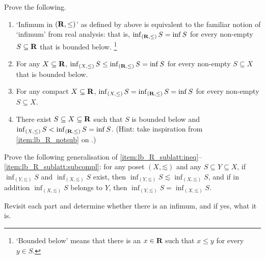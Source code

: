 \begin{exercise}
	\label{exercise:lb-R_sublatt}
	Prove the following.

	\begin{enumerate}[label=(\alph*)]

		\item `Infimum in $(\mathbf{R},\mathord{\leq})$' as defined by  above is equivalent to the familiar notion of `infimum' from real analysis: that is, $\inf_{(\mathbf{R},\mathord{\leq})} S = \inf S$ for every non-empty $S \subseteq \mathbf{R}$ that is bounded below.%
			\footnote{`Bounded below' means that there is an $x \in \mathbf{R}$ such that $x \leq y$ for every $y \in S$.}

		\item \label{item:lb_R_sublatt:ineq} For any $X \subseteq \mathbf{R}$,
		$\inf_{(X,\mathord{\leq})} S 
		\leq \inf_{(\mathbf{R},\mathord{\leq})} S
		= \inf S$ for every non-empty $S \subseteq X$ that is bounded below.

		\item \label{item:lb_R_sublatt:subcompl} For any compact $X \subseteq \mathbf{R}$,
		$\inf_{(X,\mathord{\leq})} S 
		= \inf_{(\mathbf{R},\mathord{\leq})} S
		= \inf S$ for every non-empty $S \subseteq X$.

		\item There exist $S \subseteq X \subseteq \mathbf{R}$ such that $S$ is bounded below and
		$\inf_{(X,\mathord{\leq})} S 
		< \inf_{(\mathbf{R},\mathord{\leq})} S
		= \inf S$.
		(Hint: take inspiration from \ref{item:lb_R_notsub} on .)
	
	\end{enumerate}
\end{exercise}

\begin{exercise}
	\label{exercise:lb_sublat}
	Prove the following generalisation of \ref{item:lb_R_sublatt:ineq}--\ref{item:lb_R_sublatt:subcompl}: for any poset $(X,\mathord{\lesssim})$ and any $S \subseteq Y \subseteq X$, if $\inf_{(Y,\mathord{\lesssim})} S$ and $\inf_{(X,\mathord{\lesssim})} S$ exist, then $\inf_{(Y,\mathord{\lesssim})} S \lesssim \inf_{(X,\mathord{\lesssim})} S$, and if in addition $\inf_{(X,\mathord{\lesssim})} S$ belongs to $Y$, then $\inf_{(Y,\mathord{\lesssim})} S = \inf_{(X,\mathord{\lesssim})} S$.
\end{exercise}

\begin{namedthm}
	\label{exercise:lb-R2_latt}
	Revisit each part and determine whether there is an infimum, and if yes, what it is.
\end{namedthm}

